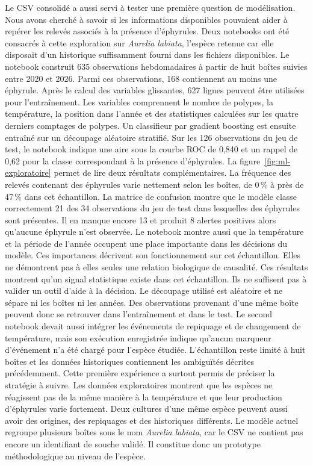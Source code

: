 \documentclass{article}
\begin{document}
Le CSV consolidé a aussi servi à tester une première question de modélisation. Nous avons cherché à savoir si les informations disponibles pouvaient aider à repérer les relevés associés à la présence d’éphyrules. Deux notebooks ont été consacrés à cette exploration sur \textit{Aurelia labiata}, l’espèce retenue car elle disposait d’un historique suffisamment fourni dans les fichiers disponibles.
Le notebook construit 635 observations hebdomadaires à partir de huit boîtes suivies entre 2020 et 2026. Parmi ces observations, 168 contiennent au moins une éphyrule. Après le calcul des variables glissantes, 627 lignes peuvent être utilisées pour l'entraînement. Les variables comprennent le nombre de polypes, la température, la position dans l’année et des statistiques calculées sur les quatre derniers comptages de polypes. Un classifieur par gradient boosting est ensuite entraîné sur un découpage aléatoire stratifié. Sur les 126 observations du jeu de test, le notebook indique une aire sous la courbe ROC de 0,840 et un rappel de 0,62 pour la classe correspondant à la présence d’éphyrules.
La figure~\ref{fig:ml-exploratoire} permet de lire deux résultats complémentaires. La fréquence des relevés contenant des éphyrules varie nettement selon les boîtes, de 0\,\% à près de 47\,\% dans cet échantillon. La matrice de confusion montre que le modèle classe correctement 21 des 34 observations du jeu de test dans lesquelles des éphyrules sont présentes. Il en manque encore 13 et produit 8 alertes positives alors qu’aucune éphyrule n’est observée. Le notebook montre aussi que la température et la période de l’année occupent une place importante dans les décisions du modèle. Ces importances décrivent son fonctionnement sur cet échantillon. Elles ne démontrent pas à elles seules une relation biologique de causalité.
Ces résultats montrent qu’un signal statistique existe dans cet échantillon. Ils ne suffisent pas à valider un outil d’aide à la décision. Le découpage utilisé est aléatoire et ne sépare ni les boîtes ni les années. Des observations provenant d’une même boîte peuvent donc se retrouver dans l’entraînement et dans le test. Le second notebook devait aussi intégrer les événements de repiquage et de changement de température, mais son exécution enregistrée indique qu’aucun marqueur d’événement n’a été chargé pour l’espèce étudiée. L’échantillon reste limité à huit boîtes et les données historiques contiennent les ambiguïtés décrites précédemment.
Cette première expérience a surtout permis de préciser la stratégie à suivre. Les données exploratoires montrent que les espèces ne réagissent pas de la même manière à la température et que leur production d’éphyrules varie fortement. Deux cultures d’une même espèce peuvent aussi avoir des origines, des repiquages et des historiques différents. Le modèle actuel regroupe plusieurs boîtes sous le nom \textit{Aurelia labiata}, car le CSV ne contient pas encore un identifiant de souche validé. Il constitue donc un prototype méthodologique au niveau de l’espèce.
\end{document}
